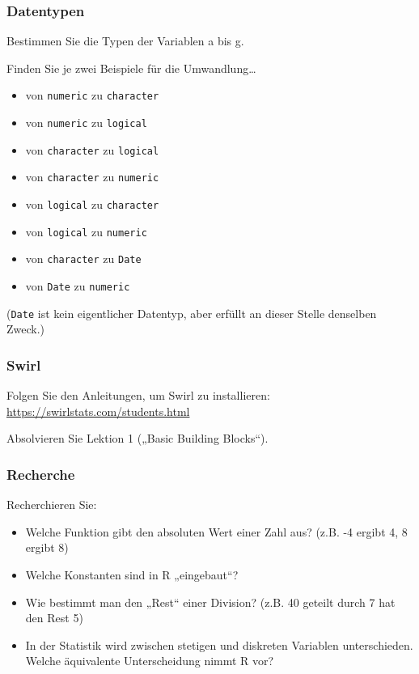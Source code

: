 \documentclass[11pt,german,a4paper]{article}
\providecommand{\tightlist}{%
  \setlength{\itemsep}{0pt}\setlength{\parskip}{0pt}}
\begin{document}
\hypertarget{datentypen-1}{%
\subsubsection{Datentypen}\label{datentypen-1}}

Bestimmen Sie die Typen der Variablen a bis g.

Finden Sie je zwei Beispiele für die Umwandlung\ldots{}

\begin{itemize}
\tightlist
\item
  von \texttt{numeric} zu \texttt{character}
\item
  von \texttt{numeric} zu \texttt{logical}
\item
  von \texttt{character} zu \texttt{logical}
\item
  von \texttt{character} zu \texttt{numeric}
\item
  von \texttt{logical} zu \texttt{character}
\item
  von \texttt{logical} zu \texttt{numeric}
\item
  von \texttt{character} zu \texttt{Date}
\item
  von \texttt{Date} zu \texttt{numeric}
\end{itemize}

(\texttt{Date} ist kein eigentlicher Datentyp, aber erfüllt an dieser Stelle denselben Zweck.)

\hypertarget{swirl}{%
\subsubsection{Swirl}\label{swirl}}

Folgen Sie den Anleitungen, um Swirl zu installieren: \url{https://swirlstats.com/students.html}

Absolvieren Sie Lektion 1 („Basic Building Blocks``).

\hypertarget{recherche}{%
\subsubsection{Recherche}\label{recherche}}

Recherchieren Sie:

\begin{itemize}
\tightlist
\item
  Welche Funktion gibt den absoluten Wert einer Zahl aus? (z.B. -4 ergibt 4, 8 ergibt 8)
\item
  Welche Konstanten sind in R „eingebaut``?
\item
  Wie bestimmt man den „Rest`` einer Division? (z.B. 40 geteilt durch 7 hat den Rest 5)
\item
  In der Statistik wird zwischen stetigen und diskreten Variablen unterschieden. Welche äquivalente Unterscheidung nimmt R vor?
\end{itemize}
\end{document}
